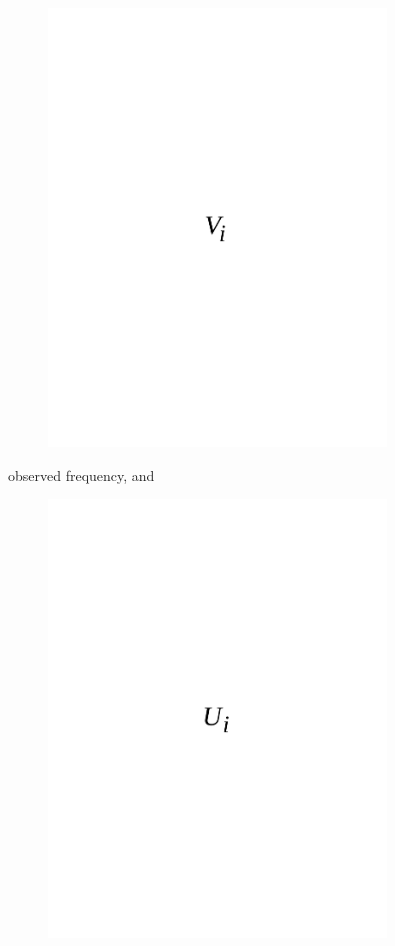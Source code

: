 \begin{figure}[H]
	\centering
	\includegraphics[width=0.8\textwidth]{media/ict/image34}
	\caption*{}
\end{figure}

observed frequency, and
\begin{figure}[H]
	\centering
	\includegraphics[width=0.8\textwidth]{media/ict/image35}
	\caption*{}
\end{figure}

